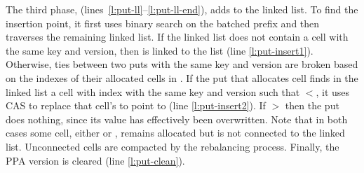 The third phase, (lines~\ref{l:put-ll}--\ref{l:put-ll-end}), adds  to the linked list.
To find the insertion point, it first uses binary search on the batched prefix and then traverses the remaining linked list.
If the linked list does not contain a cell with the same key and version, then  is linked to the list (line \ref{l:put-insert1}).
Otherwise, ties between two puts with the same key and version are broken based on the indexes of their allocated cells in .
If the put that allocates cell  finds in the linked list a cell with index  with the same key and version such that $<$,
it uses CAS to replace that cell's  to point to  (line \ref{l:put-insert2}).
If $>$ then the put does nothing, since its value has effectively been overwritten.
Note that in both cases some cell, either  or , remains allocated but is not connected to the linked list.
Unconnected cells are compacted by the  rebalancing process.
Finally, the PPA version is cleared (line \ref{l:put-clean}).


